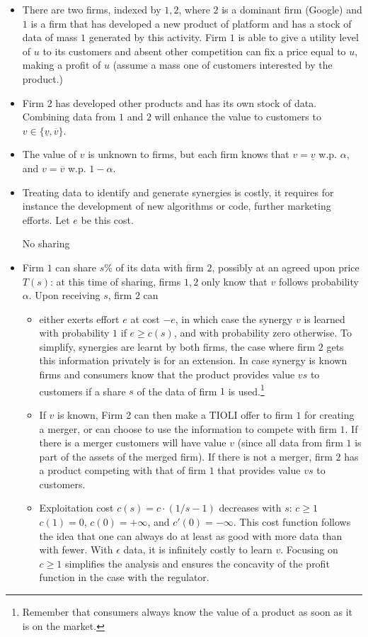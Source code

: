 \documentclass[a4paper,leqno]{article}%
\renewcommand{\a}{\alpha}
\newcommand{\uv}{\underline{v}}
\newcommand{\ov}{\overline{v}}
\begin{document}
\begin{itemize}
    \item There are two firms, indexed by $1,2$, where $2$ is a dominant firm (Google) and $1$ is a firm that has developed a new product of platform and has a stock of data of mass $1$ generated by this activity. Firm $1$ is able to give a utility level of $u$ to its customers and absent other competition can fix a price equal to $u$, making a profit of $u$ (assume a mass one of customers interested by the product.)
    \item Firm $2$ has developed other products and has its own stock of data. Combining data from $1$ and $2$ will enhance the value to customers to $v\in\{\uv,\ov\}$. 
    \item The value of $v$ is unknown to firms, but each firm knows that $v=\uv$ w.p. $\a$, and $v=\ov$ w.p. $1-\a$.
    \item Treating data to identify and generate synergies is costly, it requires for instance the development of new algorithms or code, further marketing efforts. Let $e$ be this cost. 
    \item [No sharing]
    \item Firm $1$ can share $s\%$ of its data with firm $2$, possibly at an agreed upon price $T(s)$: at this time of sharing, firms $1,2$ only know that $v$ follows probability $\a$. Upon receiving $s$, firm $2$ can 
    \begin{itemize}
        \item either exerts effort $e$ at cost $-e$, in which case the synergy $v$ is learned with probability $1$ if $e\geq c(s)$, and with probability zero otherwise. To simplify, synergies are learnt by both firms, the case where firm $2$ gets this information privately is for an extension. In case synergy is known firms and consumers know that the product provides value $v s$ to customers if a share $s$ of the data of firm $1$ is used.\footnote{Remember that consumers always know the value of a product as soon as it is on the market.} 
        \item If $v$ is known, Firm 2 can then make a TIOLI offer to firm $1$ for creating a merger, or can choose to use the information to compete with firm $1$. If there is a merger customers will have value $v$ (since all data from firm $1$ is part of the assets of the merged firm). If there is not a merger, firm $2$ has a product competing with that of firm $1$ that provides value $vs$ to customers.
        \item Exploitation cost $c(s)=c\cdot(1/s-1)$ decreases with $s$: $c\geq 1$ $c(1)=0$, $c(0)=+\infty$, and $c'(0)=-\infty$. This cost function follows the idea that one can always do at least as good with more data than with fewer. With $\epsilon$ data, it is infinitely costly to learn $v$. Focusing on $c\geq 1$ simplifies the analysis and ensures the concavity of the profit function in the case with the regulator.

\end{itemize}
\end{itemize}
\end{document}

